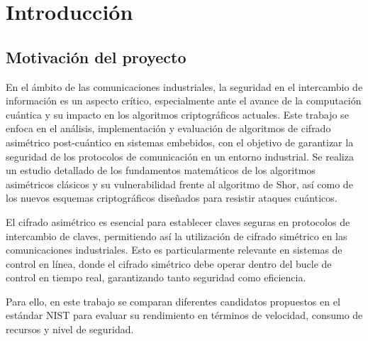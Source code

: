 \chapter{Introducción}

\section{Motivación del proyecto}
En el ámbito de las comunicaciones industriales, la seguridad en el intercambio de información es un aspecto crítico, especialmente ante el avance de la computación cuántica y su impacto en los algoritmos criptográficos actuales. Este trabajo se enfoca en el análisis, implementación y evaluación de algoritmos de cifrado asimétrico post-cuántico en sistemas embebidos, con el objetivo de garantizar la seguridad de los protocolos de comunicación en un entorno industrial. Se realiza un estudio detallado de los fundamentos matemáticos de los algoritmos asimétricos clásicos y su vulnerabilidad frente al algoritmo de Shor, así como de los nuevos esquemas criptográficos diseñados para resistir ataques cuánticos.
\newline

El cifrado asimétrico es esencial para establecer claves seguras en protocolos de intercambio de claves, permitiendo así la utilización de cifrado simétrico en las comunicaciones industriales. Esto es particularmente relevante en sistemas de control en línea, donde el cifrado simétrico debe operar dentro del bucle de control en tiempo real, garantizando tanto seguridad como eficiencia.
\newline

Para ello, en este trabajo se comparan diferentes candidatos propuestos en el estándar NIST para evaluar su rendimiento en términos de velocidad, consumo de recursos y nivel de seguridad. 

